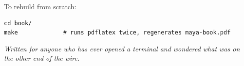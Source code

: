 \medskip

\noindent To rebuild from scratch:

\begin{verbatim}
cd book/
make             # runs pdflatex twice, regenerates maya-book.pdf
\end{verbatim}

\vfill

\begin{center}
\small\itshape
Written for anyone who has ever opened a terminal and wondered
what was on the other end of the wire.
\end{center}
